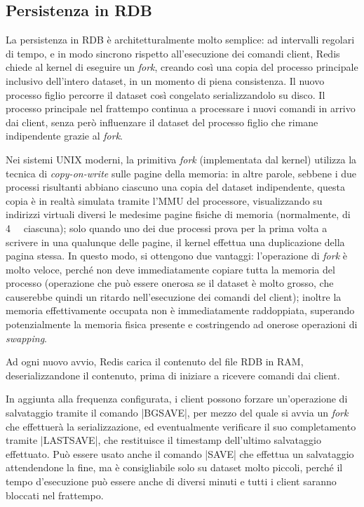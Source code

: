 \subsection{Persistenza in RDB}

La persistenza in RDB è architetturalmente molto semplice: ad intervalli regolari di tempo, e in
modo sincrono rispetto all'esecuzione dei comandi client, Redis chiede al kernel di eseguire un
\emph{fork}, creando così una copia del processo principale inclusivo dell'intero dataset, in un
momento di piena consistenza. Il nuovo processo figlio percorre il dataset così congelato
serializzandolo su disco. Il processo principale nel frattempo continua a processare i nuovi comandi
in arrivo dai client, senza però influenzare il dataset del processo figlio che rimane indipendente
grazie al \emph{fork}.

Nei sistemi UNIX moderni, la primitiva \emph{fork} (implementata dal kernel) utilizza la tecnica di
\emph{copy-on-write} sulle pagine della memoria: in altre parole, sebbene i due processi risultanti
abbiano ciascuno una copia del dataset indipendente, questa copia è in realtà simulata tramite l'MMU
del processore, visualizzando su indirizzi virtuali diversi le medesime pagine fisiche di memoria
(normalmente, di \SI{4}{\kilo\byte} ciascuna); solo quando uno dei due processi prova per la prima
volta a scrivere in una qualunque delle pagine, il kernel effettua una duplicazione della pagina
stessa. In questo modo, si ottengono due vantaggi: l'operazione di \emph{fork} è molto veloce, perché non
deve immediatamente copiare tutta la memoria del processo (operazione che può essere onerosa se il
dataset è molto grosso, che causerebbe quindi un ritardo nell'esecuzione dei comandi del client);
inoltre la memoria effettivamente occupata non è immediatamente raddoppiata, superando
potenzialmente la memoria fisica presente e costringendo ad onerose operazioni di \emph{swapping}.

Ad ogni nuovo avvio, Redis carica il contenuto del file RDB in RAM, deserializzandone il contenuto,
prima di iniziare a ricevere comandi dai client.

In aggiunta alla frequenza configurata, i client possono forzare un'operazione di salvataggio 
tramite il comando \cverb|BGSAVE|, per mezzo del quale si avvia un \emph{fork} che effettuerà la
serializzazione, ed eventualmente verificare il suo completamento tramite \cverb|LASTSAVE|, che
restituisce il timestamp dell'ultimo salvataggio effettuato. Può essere usato anche il comando
\cverb|SAVE| che effettua un salvataggio attendendone la fine, ma è consigliabile solo su dataset
molto piccoli, perché il tempo d'esecuzione può essere anche di diversi minuti e tutti i client
saranno bloccati nel frattempo.


